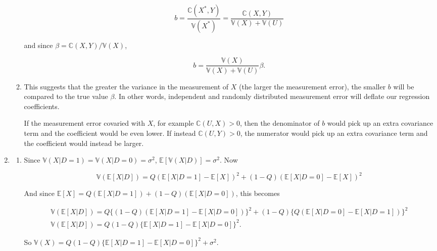 \documentclass{article}
\begin{document}
\begin{enumerate}
\begin{enumerate}
		$$b = \frac{\mathbb{C}(X^*,Y)}{\mathbb{V}(X^*)} = \frac{\mathbb{C}(X,Y)}{\mathbb{V}(X) + \mathbb{V}(U)}$$

		and since $\beta = \mathbb{C}(X,Y) / \mathbb{V}(X)$,

		$$b = \frac{\mathbb{V}(X)}{\mathbb{V}(X) + \mathbb{V}(U)} \beta.$$

		\item

		This suggests that the greater the variance in the measurement of $X$ (the larger the measurement error), the smaller $b$ will be compared to the true value $\beta$. In other words, independent and randomly distributed measurement error will deflate our regression coefficients.

		If the measurement error covaried with $X$, for example $\mathbb{C}(U,X) > 0$, then the denominator of $b$ would pick up an extra covariance term and the coefficient would be even lower. If instead $\mathbb{C}(U,Y) > 0$, the numerator would pick up an extra covariance term and the coefficient would instead be larger.

	\end{enumerate}

	\item

	\begin{enumerate}

		\item

		Since $\mathbb{V}(X|D=1) = \mathbb{V}(X|D=0) = \sigma^2$, $\mathbb{E}[\mathbb{V}(X|D)] = \sigma^2$. Now

		\begin{equation*}
		\mathbb{V}(\mathbb{E}[X|D]) = Q(\mathbb{E}[X|D=1] - \mathbb{E}[X])^2 + (1-Q)(\mathbb{E}[X|D=0] - \mathbb{E}[X])^2
		\end{equation*}

		And since $\mathbb{E}[X] = Q(\mathbb{E}[X|D=1]) + (1-Q)(\mathbb{E}[X|D=0])$, this becomes

		\begin{gather*}
		\mathbb{V}(\mathbb{E}[X|D]) = Q \{ (1-Q)(\mathbb{E}[X|D=1] - \mathbb{E}[X|D=0]) \} ^2 + (1-Q) \{ Q(\mathbb{E}[X|D=0] - \mathbb{E}[X|D=1]) \} ^2 \\
		\mathbb{V}(\mathbb{E}[X|D]) = Q (1-Q) \{ \mathbb{E}[X|D=1] - \mathbb{E}[X|D=0] \} ^2.
		\end{gather*}

		So $\mathbb{V}(X) = Q (1-Q) \{ \mathbb{E}[X|D=1] - \mathbb{E}[X|D=0] \} ^2 + \sigma^2$.


\end{enumerate}
\end{enumerate}
\end{document}
